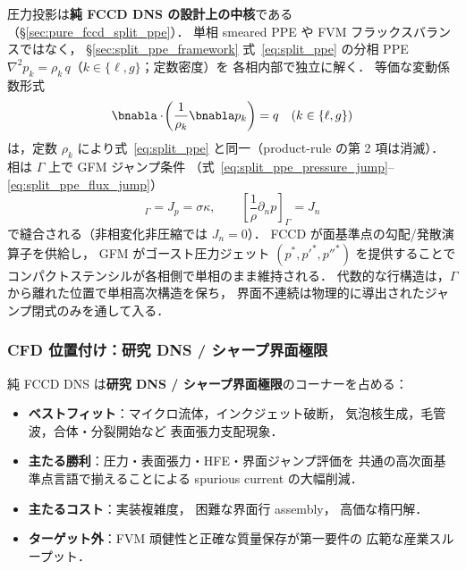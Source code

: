 圧力投影は\textbf{純 FCCD DNS の設計上の中核}である（§\ref{sec:pure_fccd_split_ppe}）．
単相 smeared PPE や FVM フラックスバランスではなく，
§\ref{sec:split_ppe_framework} 式~\eqref{eq:split_ppe} の分相 PPE
$\nabla^2 p_k = \rho_k\, q$（$k\in\{\ell,g\}$；定数密度）を
各相内部で独立に解く．
等価な変動係数形式
\begin{equation}
  \bnabla\cdot\!\left(\frac{1}{\rho_k}\bnabla p_k\right) = q
  \quad (k\in\{\ell,g\})
  \label{eq:pure_fccd_split_ppe_core}
\end{equation}
は，定数 $\rho_k$ により式~\eqref{eq:split_ppe} と同一（product-rule の第 2 項は消滅）．
相は $\Gamma$ 上で GFM ジャンプ条件
（式~\eqref{eq:split_ppe_pressure_jump}--\eqref{eq:split_ppe_flux_jump}）
\begin{equation}
  [p]_\Gamma = J_p = \sigma\kappa,
  \qquad
  \left[\frac{1}{\rho}\partial_n p\right]_\Gamma = J_n
  \label{eq:pure_fccd_gfm_jump}
\end{equation}
で縫合される（非相変化非圧縮では $J_n=0$）．
FCCD が面基準点の勾配/発散演算子を供給し，
GFM がゴースト圧力ジェット $(p^*,p'^*,p''^*)$ を提供することで
コンパクトステンシルが各相側で単相のまま維持される．
代数的な行構造は，$\Gamma$ から離れた位置で単相高次構造を保ち，
界面不連続は物理的に導出されたジャンプ閉式のみを通して入る．

\subsubsection{CFD 位置付け：研究 DNS / シャープ界面極限}
\label{sec:pure_fccd_positioning}

純 FCCD DNS は\textbf{研究 DNS / シャープ界面極限}のコーナーを占める：

\begin{itemize}[noitemsep]
  \item \textbf{ベストフィット}：マイクロ流体，インクジェット破断，
        気泡核生成，毛管波，合体・分裂開始など
        表面張力支配現象．
  \item \textbf{主たる勝利}：圧力・表面張力・HFE・界面ジャンプ評価を
        共通の高次面基準点言語で揃えることによる
        spurious current の大幅削減．
  \item \textbf{主たるコスト}：実装複雑度，
        困難な界面行 assembly，
        高価な楕円解．
  \item \textbf{ターゲット外}：FVM 頑健性と正確な質量保存が第一要件の
        広範な産業スループット．
\end{itemize}

